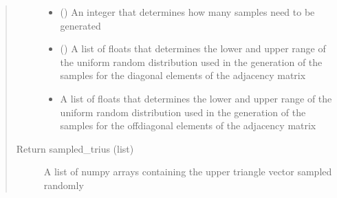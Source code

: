 \documentclass[letterpaper,10pt,english]{sphinxmanual}
\begin{document}
\begin{fulllineitems}
\begin{fulllineitems}
\begin{quote}
\begin{description}
\begin{itemize}
\item {} 
\sphinxstyleliteralstrong{\sphinxupquote{(}}\sphinxstyleliteralstrong{\sphinxupquote{)}} () \textendash{} An integer that determines how many samples need to be generated

\item {} 
\sphinxstyleliteralstrong{\sphinxupquote{(}}\sphinxstyleliteralstrong{\sphinxupquote{, }}\sphinxstyleliteralstrong{\sphinxupquote{)}} () \textendash{} A list of floats that determines the lower and upper range
of the uniform random distribution used in the generation of the samples
for the diagonal elements of the adjacency matrix

\item {} 
\sphinxstyleliteralstrong{\sphinxupquote{(}}\sphinxstyleliteralstrong{\sphinxupquote{, }}\sphinxstyleliteralstrong{\sphinxupquote{)}} \textendash{} A list of floats that determines the lower and upper range
of the uniform random distribution used in the generation of the samples
for the off\sphinxhyphen{}diagonal elements of the adjacency matrix

\end{itemize}

\item[{Return sampled\_trius (list)}] \leavevmode
A list of numpy arrays containing the upper triangle vector sampled randomly

\end{description}\end{quote}

\end{fulllineitems}



\end{fulllineitems}
\end{document}
